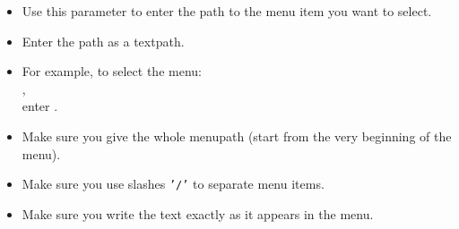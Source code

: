 
\begin{itemize}
\item Use this parameter to enter the path to the menu item you want to select.
\item Enter the path as a textpath.
\item For example, to select the menu:\\ ,\\ enter .
\item Make sure you give the whole menupath (start from the very beginning of the menu).
\item Make sure you use slashes {\tt '/'} to separate menu items.
\item Make sure you write the text exactly as it appears in the menu.
 
\end{itemize}